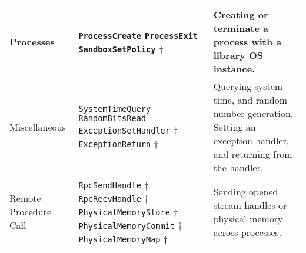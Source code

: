 \begin{tabular}{|p{}|p{}|p{}|}
\\
\hline
\raggedright
Processes & 
\raggedright
{\tt ProcessCreate} \newline
{\tt ProcessExit} \newline
{\tt SandboxSetPolicy} $\dagger$
& 
Creating or terminate a process with a library OS instance.
\\
\hline
\raggedright
Mis\-cel\-la\-ne\-ous & 
\raggedright
{\tt SystemTimeQuery} \newline
{\tt RandomBitsRead} \newline
{\tt ExceptionSetHandler} $\dagger$ \newline
{\tt ExceptionReturn} $\dagger$
& 
Querying system time, and random number generation.
Setting an exception handler, and returning from the handler.
\\
\hline
\raggedright
Remote Procedure Call & 
\raggedright
{\tt RpcSendHandle} $\dagger$ \newline
{\tt RpcRecvHandle} $\dagger$ \newline
{\tt PhysicalMemoryStore} $\dagger$ \newline
{\tt PhysicalMemoryCommit} $\dagger$ \newline
{\tt PhysicalMemoryMap} $\dagger$
& 
Sending opened stream handles or physical memory across processes.
\\
\hline
\end{tabular}